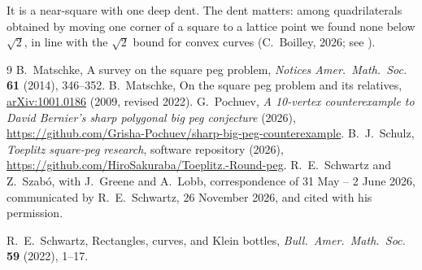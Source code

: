\documentclass[11pt,a4paper]{article}
\theoremstyle{remark}\newtheorem{remark}[theorem]{Remark}
\begin{document}
It is a near-square with one deep dent. The dent matters: among quadrilaterals
obtained by moving one corner of a square to a lattice point we found none below
$\sqrt2$, in line with the $\sqrt2$ bound for convex curves (C.~Boilley, 2026; see
\cite[v255]{schulz}).

\begin{thebibliography}{9}\small
{} B.~Matschke, A survey on the square peg problem,
\emph{Notices Amer.\ Math.\ Soc.} \textbf{61} (2014), 346--352.
 B.~Matschke, On the square peg problem and its relatives,
\href{https://arxiv.org/abs/1001.0186}{arXiv:1001.0186} (2009, revised 2022).
 G.~Pochuev, \emph{A 10-vertex counterexample to David Bernier's sharp polygonal big peg conjecture} (2026),
\url{https://github.com/Grisha-Pochuev/sharp-big-peg-counterexample}.
 B.~J.~Schulz, \emph{Toeplitz square-peg research}, software repository (2026),
\url{https://github.com/HiroSakuraba/Toeplitz.-Round-peg}.
 R.~E.~Schwartz and Z.~Szab\'o, with J.~Greene and A.~Lobb,
correspondence of 31 May -- 2 June 2026, communicated by R.~E.~Schwartz,
26 November 2026, and cited with his permission.

 R.~E.~Schwartz, Rectangles, curves, and Klein bottles,
\emph{Bull.\ Amer.\ Math.\ Soc.} \textbf{59} (2022), 1--17.
\end{thebibliography}
\end{document}
